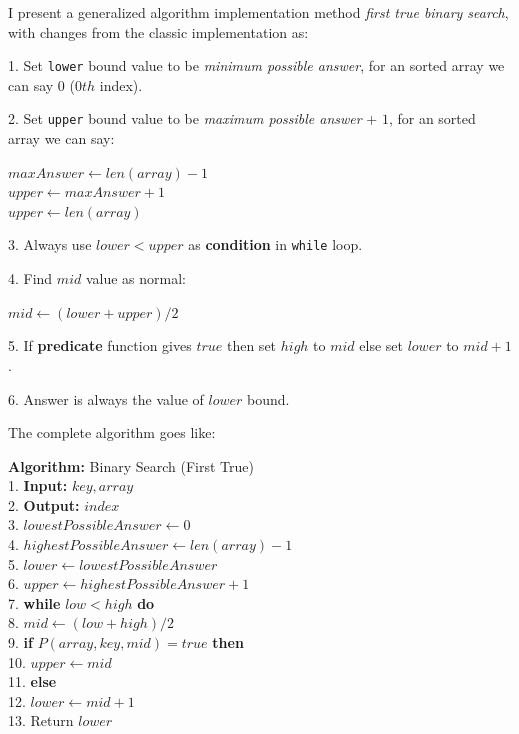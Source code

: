 \documentclass[10pt,twocolumn]{article}
\begin{document}
	I present a generalized algorithm implementation method \emph{first true binary search}, with changes from the classic implementation as:
	
	\vspace{5pt}
	
	1. Set \texttt{lower} bound value to be \emph{minimum possible answer}, for an sorted array we can say $0$ ($0th$ index).
	
	2. Set \texttt{upper} bound value to be \emph{maximum possible answer} + $1$, for an sorted array we can say:
	
	\begin{center}
		
	\quad \(maxAnswer \gets len(array) - 1\) \\
	\quad \(upper \gets maxAnswer + 1\) \\ 
	\quad \(upper \gets len(array)\) \\		
	
	
	\end{center}
	
	3. Always use $lower < upper$ as \textbf{condition} in \texttt{while} loop.
	
	4. Find \(mid\) value as normal:
	
	\begin{center}
		$mid \gets (lower + upper) / 2$
	\end{center}
	

	5. If \textbf{predicate} function gives $true$ then set \(high\)  to \(mid\) else set \(lower\) to \(mid + 1\).
	
	6. Answer is always the value of \(lower\) bound.
	
	\vspace*{5pt}
	
	The complete algorithm goes like:
	
	\vspace*{10pt}
	
	\noindent
	\textbf{Algorithm:} Binary Search (First True)\\
	1. \textbf{Input:} \(key, array\) \\
	2. \textbf{Output:} \(index\) \\
	3. \(lowestPossibleAnswer \gets 0\) \\
	4. \(highestPossibleAnswer \gets len(array) - 1\) \\
	5. \(lower \gets lowestPossibleAnswer\) \\
	6. \(upper \gets highestPossibleAnswer + 1\) \\
	7. \textbf{while} \(low < high\) \textbf{ do} \\
	8. \quad\(mid \gets (low + high) / 2\) \\
	9. \quad \textbf{if} \(P(array, key, mid) = true \) \textbf{ then} \\
	10. \quad \quad \(upper \gets mid\) \\
	11. \quad \textbf{else} \\
	12. \quad \quad \(lower \gets mid + 1\) \\
	13. Return \(lower\)
	
\end{document}

